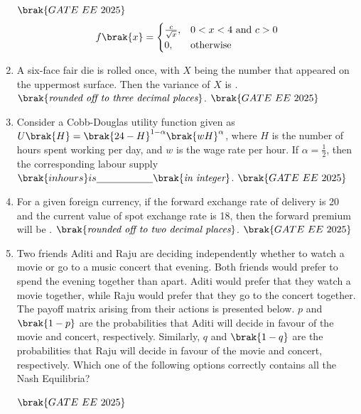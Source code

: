 \documentclass[journal,12pt,onecolumn]{IEEEtran}
\theoremstyle{remark}
\begin{document}
\begin{enumerate}
\hfill $\brak{GATE\ EE\ 2025}$  
\begin{align} 
f \brak{x} =
  \begin{cases}
    \frac{c}{\sqrt{x}}, & 0 < x < 4\text{ and } c > 0 \\
    0, & \text{otherwise}
  \end{cases}
 \end{align}
\item A six-face fair die is rolled once, with $X$ being the number that appeared on the uppermost surface. Then the variance of $X$ is \underline{\hspace{2cm}}.  $\brak{\textit{rounded off to three decimal places}}$.
 \hfill $\brak{GATE\ EE\ 2025}$
\item Consider a Cobb-Douglas utility function given as $U \brak{H} =  \brak{24-H}^{1-\alpha} \brak{wH}^\alpha$, where $H$ is the number of hours spent working per day, and $w$ is the wage rate per hour. If $\alpha = \frac{1}{2}$, then the corresponding labour supply  $\brak{in hours} is \underline{\hspace{2cm}}  \brak{\textit{in integer}}$.
 \hfill $\brak{GATE\ EE\ 2025}$
\item For a given foreign currency, if the forward exchange rate of delivery is 20 and the current value of spot exchange rate is 18, then the forward premium will be \underline{\hspace{2cm}}.  $\brak{\textit{rounded off to two decimal places}}$.
 \hfill $\brak{GATE\ EE\ 2025}$
\item Two friends Aditi and Raju are deciding independently whether to watch a movie or go to a music concert that evening. Both friends would prefer to spend the evening together than apart. Aditi would prefer that they watch a movie together, while Raju would prefer that they go to the concert together. The payoff matrix arising from their actions is presented below. $p$ and $ \brak{1-p}$ are the probabilities that Aditi will decide in favour of the movie and concert, respectively. Similarly, $q$ and $ \brak{1-q}$ are the probabilities that Raju will decide in favour of the movie and concert, respectively. Which one of the following options correctly contains all the Nash Equilibria?
\begin{table}[H]
\centering

\end{table}
\hfill $\brak{GATE\ EE\ 2025}$
\begin{enumerate}
\end{enumerate}
\end{enumerate}
\end{document}
